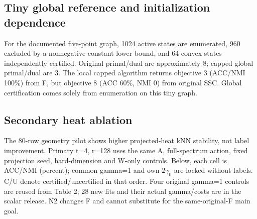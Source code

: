\subsection{Tiny global reference and initialization dependence}
For the documented five-point graph, 1024 active states are enumerated, 960 excluded by a nonnegative constant lower bound, and 64 convex states independently certified. Original primal/dual are approximately 8; capped global primal/dual are 3. The local capped algorithm returns objective 3 (ACC/NMI 100\%) from F, but objective 8 (ACC 60\%, NMI 0) from original SSC. Global certification comes solely from enumeration on this tiny graph.
\subsection{Secondary heat ablation}
The 80-row geometry pilot shows higher projected-heat kNN stability, not label improvement. Primary t=4, r=128 uses the same A, full-spectrum action, fixed projection seed, hard-dimension and W-only controls. Below, each cell is ACC/NMI (percent); common gamma=1 and own $2\gamma_0$ are locked without labels. C/U denote certified/uncertified in that order. Four original gamma=1 controls are reused from Table 2; 28 new fits and their actual gamma/costs are in the scalar release. N2 changes F and cannot substitute for the same-original-F main goal.
